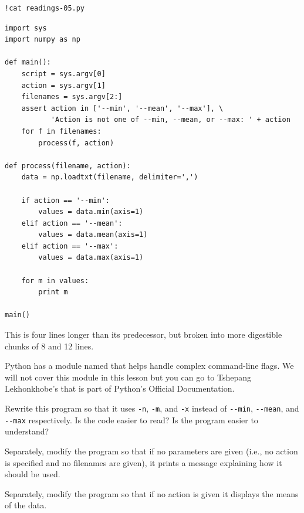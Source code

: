 \documentclass{book}
\begin{document}
\begin{verbatim}
!cat readings-05.py
\end{verbatim}

\begin{verbatim}
import sys
import numpy as np

def main():
    script = sys.argv[0]
    action = sys.argv[1]
    filenames = sys.argv[2:]
    assert action in ['--min', '--mean', '--max'], \
           'Action is not one of --min, --mean, or --max: ' + action
    for f in filenames:
        process(f, action)

def process(filename, action):
    data = np.loadtxt(filename, delimiter=',')

    if action == '--min':
        values = data.min(axis=1)
    elif action == '--mean':
        values = data.mean(axis=1)
    elif action == '--max':
        values = data.max(axis=1)

    for m in values:
        print m

main()
\end{verbatim}

This is four lines longer than its predecessor, but broken into more
digestible chunks of 8 and 12 lines.

Python has a module named
 that
helps handle complex command-line flags. We will not cover this module
in this lesson but you can go to Tshepang Lekhonkhobe's
that is part of Python's Official Documentation.

\begin{challenge}
  Rewrite this program so that it uses \texttt{-n}, \texttt{-m}, and
  \texttt{-x} instead of \texttt{-{}-min}, \texttt{-{}-mean}, and
  \texttt{-{}-max} respectively. Is the code easier to read? Is the
  program easier to understand?
\end{challenge}

\begin{challenge}
  Separately, modify the program so that if no parameters are given
  (i.e., no action is specified and no filenames are given), it prints a
  message explaining how it should be used.
\end{challenge}

\begin{challenge}
  Separately, modify the program so that if no action is given it
  displays the means of the data.
\end{challenge}
\end{document}
